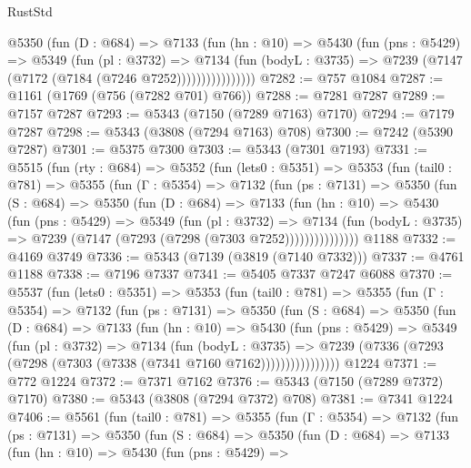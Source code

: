 \begin{lexlean}{RustStd}
\begin{coremodule}
                @5350
                  (fun (D : @684) =>
                  @7133
                    (fun (hn : @10) =>
                    @5430
                      (fun (pns : @5429) =>
                      @5349
                        (fun (pl : @3732) =>
                        @7134
                          (fun (bodyL : @3735) =>
                          @7239 (@7147 (@7172 (@7184 (@7246 @7252))))))))))))))))
@7282 := @757 @1084
@7287 := @1161 (@1769 (@756 (@7282 @701) @766))
@7288 := @7281 @7287
@7289 := @7157 @7287
@7293 := @5343 (@7150 (@7289 @7163) @7170)
@7294 := @7179 @7287
@7298 := @5343 (@3808 (@7294 @7163) @708)
@7300 := @7242 (@5390 @7287)
@7301 := @5375 @7300
@7303 := @5343 (@7301 @7193)
@7331 := @5515
    (fun (rty : @684) =>
    @5352
      (fun (lets0 : @5351) =>
      @5353
        (fun (tail0 : @781) =>
        @5355
          (fun (Γ : @5354) =>
          @7132
            (fun (ps : @7131) =>
            @5350
              (fun (S : @684) =>
              @5350
                (fun (D : @684) =>
                @7133
                  (fun (hn : @10) =>
                  @5430
                    (fun (pns : @5429) =>
                    @5349
                      (fun (pl : @3732) =>
                      @7134
                        (fun (bodyL : @3735) =>
                        @7239 (@7147 (@7293 (@7298 (@7303 @7252)))))))))))))))
    @1188
@7332 := @4169 @3749
@7336 := @5343 (@7139 (@3819 (@7140 @7332)))
@7337 := @4761 @1188
@7338 := @7196 @7337
@7341 := @5405 @7337 @7247 @6088
@7370 := @5537
    (fun (lets0 : @5351) =>
    @5353
      (fun (tail0 : @781) =>
      @5355
        (fun (Γ : @5354) =>
        @7132
          (fun (ps : @7131) =>
          @5350
            (fun (S : @684) =>
            @5350
              (fun (D : @684) =>
              @7133
                (fun (hn : @10) =>
                @5430
                  (fun (pns : @5429) =>
                  @5349
                    (fun (pl : @3732) =>
                    @7134
                      (fun (bodyL : @3735) =>
                      @7239 (@7336 (@7293 (@7298 (@7303 (@7338 (@7341 @7160 @7162))))))))))))))))
    @1224
@7371 := @772 @1224
@7372 := @7371 @7162
@7376 := @5343 (@7150 (@7289 @7372) @7170)
@7380 := @5343 (@3808 (@7294 @7372) @708)
@7381 := @7341 @1224
@7406 := @5561
    (fun (tail0 : @781) =>
    @5355
      (fun (Γ : @5354) =>
      @7132
        (fun (ps : @7131) =>
        @5350
          (fun (S : @684) =>
          @5350
            (fun (D : @684) =>
            @7133
              (fun (hn : @10) =>
              @5430
                (fun (pns : @5429) =>

\end{coremodule}
\end{lexlean}
